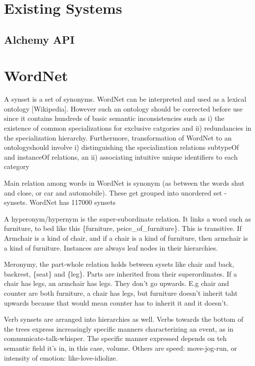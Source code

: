 \section{Existing Systems}
\subsection{Alchemy API}

\section{WordNet}
A synset is a set of synonyms. 
WordNet can be interpreted and used as a lexical ontology [Wikipedia]. However such an ontology should be corrected before use since it contains hundreds of basic semantic inconsistencies such as 
i) the existence of common specializations for exclusive catgories and 
ii) redundancies in the specialization hierarchy.
Furthermore, transformation of WordNet to an ontologyshould involve 
i) distinguishing the specialization relations subtypeOf and instanceOf relations, an
ii) associating intuitive unique identifiers to each category

Main relation among words in WordNet is synonym (as between the words shut and close, or car and automobile). These get grouped into unordered set - synsets. WordNet has 117000 synsets

A hyperonym/hypernym is the super-subordinate relation. It links a word such as furniture, to bed like this \{furniture, peice\_of\_furniture\}. This is transitive. If Armchair is a kind of chair, and if a chair is a kind of furniture, then armchair is a kind of furniture. Instances are always leaf nodes in their hierarchies. 

Meronymy, the part-whole relation holds between sysets like {chair} and {back, backrest}, \{seat\} and \{leg\}. Parts are inherited from their superordinates. If a chair has legs, an armchair has legs. They don't go upwards. E.g chair and counter are both furniture, a chair has legs, but furniture doesn't inherit taht upwards because that would mean counter has to inherit it and it doesn't.

Verb synsets are arranged into hierarchies as well. Verbs towards the bottom of the trees express increasingly specific manners characterizing an event, as in {communicate}-{talk}-{whisper}. The specific manner expressed depends on teh semantic field it's in, in this case, volume. Others are speed: {move}-{jog}-{run}, or intensity of emotion: {like-love-idiolize}.

